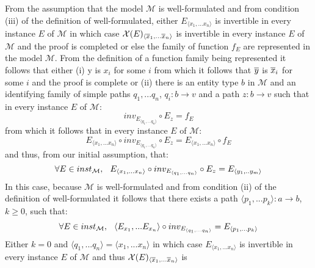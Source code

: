 \documentclass[10pt,a4paper]{article}
\newcommand{\genericmodel}{\mathcal{M}}
\newcommand{\logtophys}{\mathcal{X}}
\begin{document}
\noindent
From the assumption that the model $\genericmodel$ is well-formulated and from condition (iii) 
of the definition of well-formulated, either 
$E_{\langle x_1,...x_n \rangle}$ is invertible in every instance $E$ of $\genericmodel$ in which case 
$\logtophys(E)_{\langle \phys{x}_1,...\phys{x}_n \rangle}$ is invertible in every instance $E$ of $\genericmodel$ and the proof is completed or else
the family of function $f_E$ are represented in the model $\genericmodel$. From the definition of a function family being represented it follows that
either (i)  y is $x_i$ for some $i$ 
from which it follows that $\overline{y}$ is $\overline{x}_i$ for some $i$ and the proof is complete or (ii) there
is an entity type $b$ in $\genericmodel$ and an identifying family of simple paths $q_1,...q_n$, 
$q_i: b \rightarrow v$ and a 
path $z: b \rightarrow v$ such that in every instance $E$ of $\genericmodel$:
\newcommand{\ineveryinstance}{\forall E \in inst_\genericmodel ,  \hspace{0.25cm} }
\begin{equation*}
inv_{E_{\langle q_1,...q_n \rangle}} \circ E_{z} = f_E
\end{equation*}
\noindent from which it follows that in every instance $E$ of $\genericmodel$:  
\begin{equation*}
E_{\langle x_1,...x_n \rangle}\circ inv_{E_{\langle q_1,...q_n \rangle}} \circ E_{z}  = E_{\langle x_1,...x_n \rangle} \circ f_E 
\end{equation*}
\noindent and thus, from our initial assumption, that:
\begin{equation}
\label{representationByIdentifyingRelationships}
\ineveryinstance E_{\langle x_1,...x_n \rangle}\circ inv_{E_{\langle q_1,...q_n \rangle}} \circ E_{z} = E_{\langle y_1,..y_m \rangle} 
\end{equation}
\noindent In this case, because $\genericmodel$ is well-formulated and from condition (ii) of the definition of well-formulated it follows that there exists
a path $\langle p_1,...p_k \rangle:a \rightarrow b$, $k \geq 0$, such that:
\begin{equation}
\label{simpleRepresentationOfFirstPart}
\ineveryinstance \langle E_{x_1},...E_{x_n} \rangle \circ inv_{E_{\langle q_1,...q_n \rangle}} = E_{\langle p_1,...p_k \rangle}
\end{equation}
\noindent Either $k=0$ and $\langle q_1,...q_n \rangle = \langle x_1,...x_n \rangle$ in which case $E_{\langle x_1,...x_n \rangle}$ is
invertible in every instance $E$ of $\genericmodel$ and thus $\logtophys(E)_{\langle \phys{x}_1,...\phys{x}_n \rangle}$ is
\end{document}

